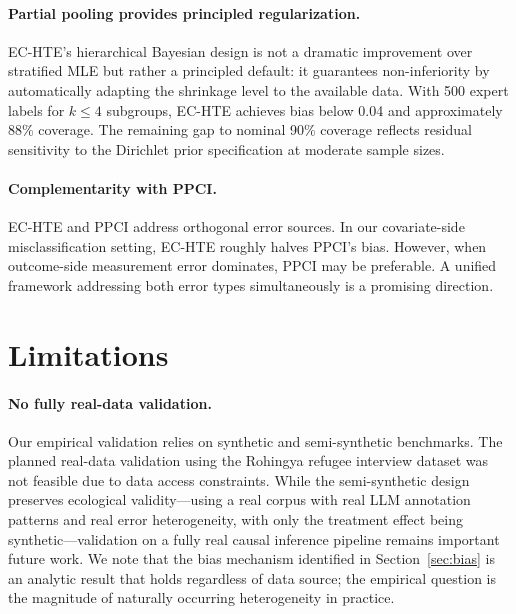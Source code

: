 \documentclass[11pt,a4paper]{article}
\begin{document}
\paragraph{Partial pooling provides principled regularization.}
EC-HTE's hierarchical Bayesian design is not a dramatic improvement over stratified MLE but rather a principled default: it guarantees non-inferiority by automatically adapting the shrinkage level to the available data.
With 500 expert labels for $k \leq 4$ subgroups, EC-HTE achieves bias below 0.04 and approximately 88\% coverage.
The remaining gap to nominal 90\% coverage reflects residual sensitivity to the Dirichlet prior specification at moderate sample sizes.

\paragraph{Complementarity with PPCI.}
EC-HTE and PPCI address orthogonal error sources.
In our covariate-side misclassification setting, EC-HTE roughly halves PPCI's bias.
However, when outcome-side measurement error dominates, PPCI may be preferable.
A unified framework addressing both error types simultaneously is a promising direction.

\section{Limitations}

\paragraph{No fully real-data validation.}
Our empirical validation relies on synthetic and semi-synthetic benchmarks.
The planned real-data validation using the \citet{ashwin2025} Rohingya refugee interview dataset was not feasible due to data access constraints.
While the semi-synthetic design preserves ecological validity---using a real corpus with real LLM annotation patterns and real error heterogeneity, with only the treatment effect being synthetic---validation on a fully real causal inference pipeline remains important future work.
We note that the bias mechanism identified in Section~\ref{sec:bias} is an analytic result that holds regardless of data source; the empirical question is the magnitude of naturally occurring heterogeneity in practice.
\end{document}
